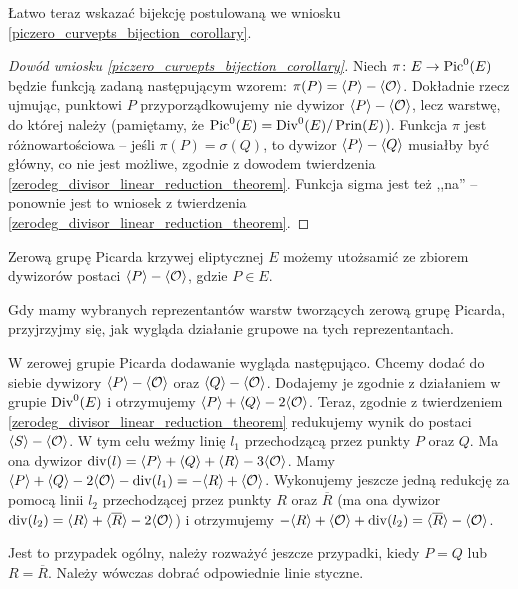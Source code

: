 Łatwo teraz wskazać bijekcję
postulowaną we wniosku \ref{piczero_curvepts_bijection_corollary}.

\begin{proof}[Dowód wniosku \ref{piczero_curvepts_bijection_corollary}]
Niech $\pi \colon E \to \operatorname{Pic}^0(E)$
będzie funkcją zadaną następującym wzorem:
$\pi(P) = \langle P\rangle - \langle\mathcal{O}\rangle$.
Dokładnie rzecz ujmując,
punktowi $P$ przyporządkowujemy nie dywizor $\langle P\rangle - \langle\mathcal{O}\rangle$,
lecz warstwę, do której należy
(pamiętamy, że $\operatorname{Pic}^0(E) = \operatorname{Div}^0(E)/\operatorname{Prin}(E)$).
Funkcja $\pi$ jest różnowartościowa --
jeśli $\pi(P) = \sigma(Q)$,
to dywizor $\langle P\rangle - \langle Q\rangle$ musiałby być główny,
co nie jest możliwe,
zgodnie z dowodem twierdzenia \ref{zerodeg_divisor_linear_reduction_theorem}.
Funkcja sigma jest też ,,na'' --
ponownie jest to wniosek z twierdzenia
\ref{zerodeg_divisor_linear_reduction_theorem}.
\end{proof}

\begin{corollary}\label{piczero_representants_coro}
Zerową grupę Picarda krzywej eliptycznej $E$
możemy utożsamić ze zbiorem dywizorów postaci $\langle P\rangle - \langle\mathcal{O}\rangle$,
gdzie $P \in E$.
\end{corollary}

Gdy mamy wybranych reprezentantów warstw tworzących zerową grupę Picarda,
przyjrzyjmy się, jak wygląda działanie grupowe na tych reprezentantach.

\begin{remark}\label{piczero_addition_remark}
W zerowej grupie Picarda dodawanie wygląda następująco.
Chcemy dodać do siebie dywizory
$\langle P\rangle - \langle\mathcal{O}\rangle$ oraz $\langle Q\rangle - \langle\mathcal{O}\rangle$.
Dodajemy je zgodnie z działaniem w grupie $\operatorname{Div}^0(E)$
i otrzymujemy $\langle P\rangle + \langle Q\rangle - 2\langle\mathcal{O}\rangle$.
Teraz, zgodnie z twierdzeniem \ref{zerodeg_divisor_linear_reduction_theorem}
redukujemy wynik do postaci $\langle S\rangle - \langle\mathcal{O}\rangle$.
W tym celu weźmy linię $l_1$ przechodzącą przez punkty $P$ oraz $Q$.
Ma ona dywizor $\operatorname{div}(l) = \langle P\rangle + \langle Q\rangle + \langle R\rangle - 3\langle\mathcal{O}\rangle$.
Mamy
$\langle P\rangle + \langle Q\rangle - 2\langle\mathcal{O}\rangle - \operatorname{div}(l_1) =
-\langle R\rangle + \langle\mathcal{O}\rangle$.
Wykonujemy jeszcze jedną redukcję za pomocą linii $l_2$
przechodzącej przez punkty $R$ oraz $\overline{R}$
(ma ona dywizor
$\operatorname{div}(l_2) = \langle R\rangle + \langle\overline{R}\rangle - 2\langle\mathcal{O}\rangle$)
i otrzymujemy
$-\langle R\rangle + \langle\mathcal{O}\rangle + \operatorname{div}(l_2) =
\langle\overline{R}\rangle - \langle\mathcal{O}\rangle$.

Jest to przypadek ogólny, należy rozważyć jeszcze przypadki,
kiedy $P = Q$ lub $R = \overline{R}$.
Należy wówczas dobrać odpowiednie linie styczne.
\end{remark}
